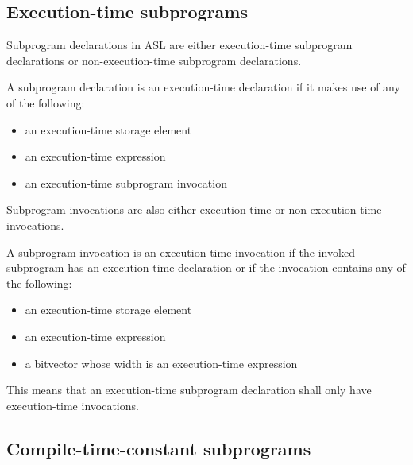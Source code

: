 \documentclass{book}
\begin{document}
\subsection{Execution-time subprograms}



Subprogram declarations in ASL are either execution-time subprogram
declarations or non-execution-time subprogram declarations.


A subprogram declaration is an execution-time declaration if it makes use of
any of the following:
\begin{itemize}
\item an execution-time storage element
\item an execution-time expression
\item an execution-time subprogram invocation
\end{itemize}


Subprogram invocations are also either execution-time or non-execution-time invocations.


A subprogram invocation is an execution-time invocation if the invoked
subprogram has an execution-time declaration or if the invocation contains any
of the following:
\begin{itemize}
\item an execution-time storage element
\item an execution-time expression
\item a bitvector whose width is an execution-time expression
\end{itemize}


This means that an execution-time subprogram declaration shall only have
execution-time invocations.

\subsection{Compile-time-constant subprograms}

\end{document}
